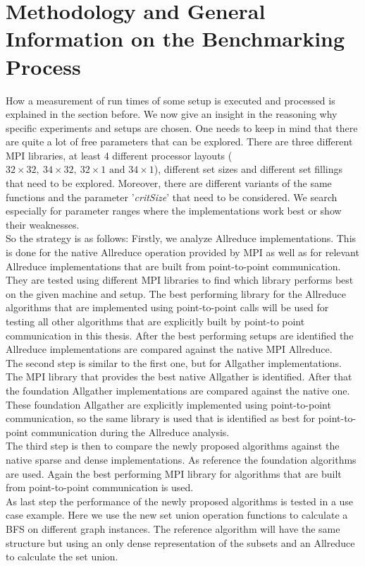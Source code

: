 \section{Methodology and General Information on the Benchmarking Process}
How a measurement of run times of some setup is executed and processed is explained in the section before. We now give an insight in the reasoning why specific experiments and setups are chosen. One needs to keep in mind that there are quite a lot of free parameters that can be explored. There are three different MPI libraries, at least 4 different processor layouts ($32\times 32,~ 34\times 32,~ 32\times 1 \text{ and } 34\times 1$), different set sizes and different set fillings that need to be explored. Moreover, there are different variants of the same functions and the parameter '\textit{critSize}' that need to be considered. We search especially for parameter ranges where the implementations work best or show their weaknesses.\\
So the strategy is as follows: Firstly, we analyze Allreduce implementations. This is done for the native Allreduce operation provided by MPI as well as for relevant Allreduce implementations that are built from point-to-point communication. They are tested using different MPI libraries to find which library performs best on the given machine and setup. The best performing library for the Allreduce algorithms that are implemented using point-to-point calls will be used for testing all other algorithms that are explicitly built by point-to point communication in this thesis. After the best performing setups are identified the Allreduce implementations are compared against the native MPI Allreduce.\\
The second step is similar to the first one, but for Allgather implementations. The MPI library that provides the best native Allgather is identified. After that the foundation Allgather implementations are compared against the native one. These foundation Allgather are explicitly implemented using point-to-point communication, so the same library is used that is identified  as best for point-to-point communication during the Allreduce analysis.\\
The third step is then to compare the newly proposed algorithms against the native sparse and dense implementations. As reference the foundation algorithms are used. Again the best performing MPI library for algorithms that are built from point-to-point communication is used.\\
As last step the performance of the newly proposed algorithms is tested in a use case  example. Here we use the new set union operation functions to calculate a BFS on different graph instances. The reference algorithm will have the same structure but using an only dense representation of the subsets and an Allreduce to calculate the set union.

